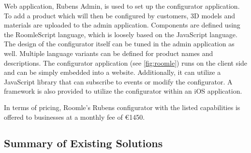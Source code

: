 Web application, Rubens Admin, is used to set up the configurator application. To add a product which will then be configured by customers, 3D models and materials are uploaded to the admin application. Components are defined using the RoomleScript language, which is loosely based on the JavaScript language. The design of the configurator itself can be tuned in the admin application as well. Multiple language variants can be defined for product names and descriptions. The configurator application (see \autoref{fig:roomle}) runs on the client side and can be simply embedded into a website. Additionally, it can utilize a JavaScript library that can subscribe to events or modify the configurator. A framework is also provided to utilize the configurator within an iOS application. \cite{RoomleDocumentation}

In terms of pricing, Roomle's Rubens configurator with the listed capabilities is offered to businesses at a monthly fee of €1450. \cite{RoomleFullLogic}

\subsection{Summary of Existing Solutions}

